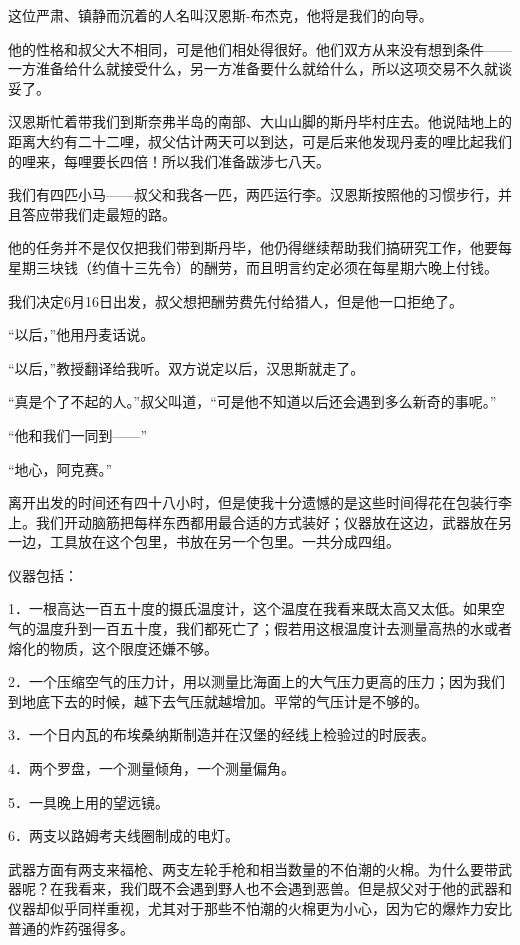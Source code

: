 \documentclass[10pt]{book}
\begin{document}
这位严肃、镇静而沉着的人名叫汉恩斯-布杰克，他将是我们的向导。

他的性格和叔父大不相同，可是他们相处得很好。他们双方从来没有想到条件——一方淮备给什么就接受什么，另一方准备要什么就给什么，所以这项交易不久就谈妥了。

汉恩斯忙着带我们到斯奈弗半岛的南部、大山山脚的斯丹毕村庄去。他说陆地上的距离大约有二十二哩，叔父估计两天可以到达，可是后来他发现丹麦的哩比起我们的哩来，每哩要长四倍！所以我们准备跋涉七八天。

我们有四匹小马——叔父和我各一匹，两匹运行李。汉恩斯按照他的习惯步行，并且答应带我们走最短的路。

他的任务并不是仅仅把我们带到斯丹毕，他仍得继续帮助我们搞研究工作，他要每星期三块钱（约值十三先令）的酬劳，而且明言约定必须在每星期六晚上付钱。

我们决定6月16日出发，叔父想把酬劳费先付给猎人，但是他一口拒绝了。

“以后，”他用丹麦话说。

“以后，”教授翻译给我听。双方说定以后，汉思斯就走了。

“真是个了不起的人。”叔父叫道，“可是他不知道以后还会遇到多么新奇的事呢。”

“他和我们一同到——”

“地心，阿克赛。”

离开出发的时间还有四十八小时，但是使我十分遗憾的是这些时间得花在包装行李上。我们开动脑筋把每样东西都用最合适的方式装好；仪器放在这边，武器放在另一边，工具放在这个包里，书放在另一个包里。一共分成四组。

仪器包括：

1．一根高达一百五十度的摄氏温度计，这个温度在我看来既太高又太低。如果空气的温度升到一百五十度，我们都死亡了；假若用这根温度计去测量高热的水或者熔化的物质，这个限度还嫌不够。

2．一个压缩空气的压力计，用以测量比海面上的大气压力更高的压力；因为我们到地底下去的时候，越下去气压就越增加。平常的气压计是不够的。

3．一个日内瓦的布埃桑纳斯制造并在汉堡的经线上检验过的时辰表。

4．两个罗盘，一个测量倾角，一个测量偏角。

5．一具晚上用的望远镜。

6．两支以路姆考夫线圈制成的电灯。

武器方面有两支来福枪、两支左轮手枪和相当数量的不伯潮的火棉。为什么要带武器呢？在我看来，我们既不会遇到野人也不会遇到恶兽。但是叔父对于他的武器和仪器却似乎同样重视，尤其对于那些不怕潮的火棉更为小心，因为它的爆炸力安比普通的炸药强得多。
\end{document}
